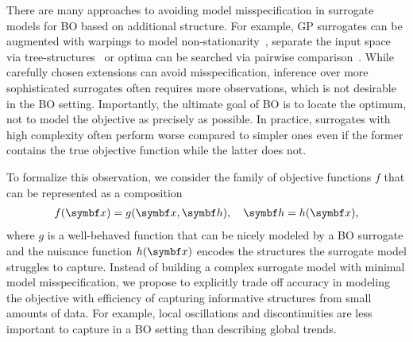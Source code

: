 There are many approaches to avoiding model misspecification in surrogate models for BO based on additional structure.
For example, GP surrogates can be augmented with warpings to model non-stationarity~\parencite{snoek_input_2014}, separate the input space via tree-structures~\parencite{jenatton_bayesian_2017} or optima can be searched via pairwise comparison~\parencite{gonzalez_preferential_2017}.
While carefully chosen extensions can avoid misspecification, inference over more sophisticated surrogates often requires more observations, which is not desirable in the BO setting.
Importantly, the ultimate goal of BO is to locate the optimum, not to model the objective as precisely as possible.
In practice, surrogates with high complexity often perform worse compared to simpler ones even if the former contains the true objective function while the latter does not.

To formalize this observation, we consider the family of objective functions $f$ that can be represented as a composition
\begin{align}
    f(\mat{x}) = g(\mat{x}, \mat{h}), \quad \mat{h}=h(\mat{x}),
\end{align}
where $g$ is a well-behaved function that can be nicely modeled by a BO surrogate and the nuisance function $h(\mat{x})$ encodes the structures the surrogate model struggles to capture.
Instead of building a complex surrogate model with minimal model misspecification, we propose to explicitly trade off accuracy in modeling the objective with efficiency of capturing informative structures from small amounts of data.
For example, local oscillations and discontinuities are less important to capture in a BO setting than describing global trends.


